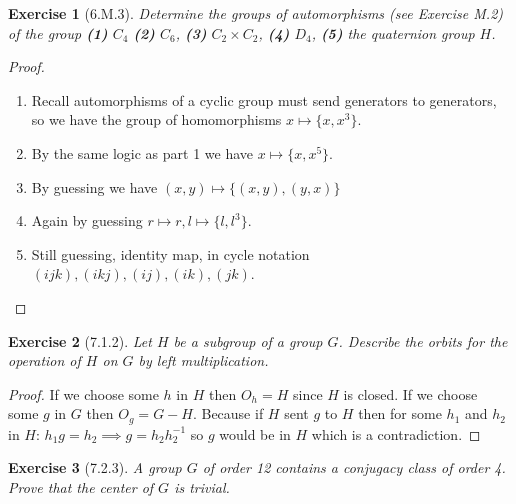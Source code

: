 \documentclass[12pt]{article}
\newtheorem*{exer}{Exercise}
\begin{document}
\begin{exer}[6.M.3]
    Determine the groups of automorphisms (see Exercise M.2) of the
    group \textbf{(1)} $C_4$ \textbf{(2)} $C_6$, \textbf{(3)} $C_2
    \times C_2$, \textbf{(4)} $D_4$, \textbf{(5)} the quaternion group
    $H$.
\end{exer}

\begin{proof}
    \begin{enumerate}
        \item Recall automorphisms of a cyclic group must send
            generators to generators, so we have the group of
            homomorphisms $x \mapsto \{x, x^3\}$.

        \item By the same logic as part 1 we have $ x \mapsto \{x, x^5\}$.

        \item By guessing we have $(x, y) \mapsto \{(x,y), (y,x)\}$
            
        \item Again by guessing $r \mapsto r, l \mapsto \{l, l^3\}$.

        \item Still guessing, identity map, in cycle notation $(ijk),
            (ikj), (ij), (ik), (jk)$.

    \end{enumerate}

\end{proof}


\begin{exer}[7.1.2]
    Let $H$ be a subgroup of a group $G$. Describe the orbits for the
    operation of $H$ on $G$ by left multiplication.
\end{exer}

\begin{proof}
    If we choose some $h$ in $H$ then $O_h = H$ since $H$ is closed. If
    we choose some $g$ in $G$ then $O_g = G - H$. Because if $H$ sent
    $g$ to $H$ then for some $h_1$ and $h_2$ in $H$: $h_1
    g = h_2 \implies g = h_2 h_{2}^{-1}$ so $g$ would be in $H$ which is
    a contradiction.

\end{proof}


\begin{exer}[7.2.3]
    A group $G$ of order 12 contains a conjugacy class of order 4. Prove
    that the center of $G$ is trivial.
\end{exer}
\end{document}
